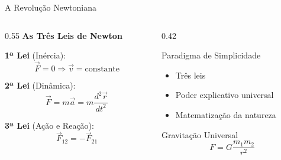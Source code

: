 \documentclass[aspectratio=169,12pt]{beamer}
\begin{document}
\begin{frame}{A Revolução Newtoniana}
    \begin{columns}[T]
        \begin{column}{0.55\textwidth}
            \textbf{As Três Leis de Newton}
            \vspace{0.3cm}

            \textbf{1ª Lei} (Inércia):
            \begin{equation*}
                \vec{F} = 0 \Rightarrow \vec{v} = \text{constante}
            \end{equation*}

            \textbf{2ª Lei} (Dinâmica):
            \begin{equation*}
                \vec{F} = m\vec{a} = m\frac{d^2\vec{r}}{dt^2}
            \end{equation*}

            \textbf{3ª Lei} (Ação e Reação):
            \begin{equation*}
                \vec{F}_{12} = -\vec{F}_{21}
            \end{equation*}
        \end{column}
        \begin{column}{0.42\textwidth}
            \begin{block}{Paradigma de Simplicidade}
                \begin{itemize}
                    \item Três leis
                    \item Poder explicativo universal
                    \item Matematização da natureza
                \end{itemize}
            \end{block}
            \vspace{0.3cm}
            \begin{alertblock}{Gravitação Universal}
                \begin{equation*}
                    F = G\frac{m_1 m_2}{r^2}
                \end{equation*}
            \end{alertblock}
        \end{column}
    \end{columns}
\end{frame}
\end{document}
